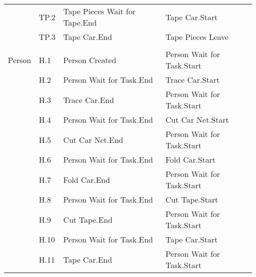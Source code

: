 \begin{longtable}{p{2.4cm}>{\raggedright\arraybackslash}p{1.2cm}>{\raggedright\arraybackslash}p{5.9cm}>{\raggedright\arraybackslash}p{5.9cm}}
           & TP.2 & Tape Pieces Wait for Tape.End & Tape Car.Start \\
           & TP.3 & Tape Car.End & Tape Pieces Leave \\
     &      &              &              \\
Person & H.1 & Person Created & Person Wait for Task.Start \\
       & H.2 & Person Wait for Task.End & Trace Car.Start \\
       & H.3 & Trace Car.End & Person Wait for Task.Start \\
       & H.4 & Person Wait for Task.End & Cut Car Net.Start \\
       & H.5 & Cut Car Net.End & Person Wait for Task.Start \\
       & H.6 & Person Wait for Task.End & Fold Car.Start \\
       & H.7 & Fold Car.End & Person Wait for Task.Start \\
       & H.8 & Person Wait for Task.End & Cut Tape.Start \\
       & H.9 & Cut Tape.End & Person Wait for Task.Start \\
       & H.10 & Person Wait for Task.End & Tape Car.Start \\
       & H.11 & Tape Car.End & Person Wait for Task.Start \\\bottomrule
\end{longtable}

